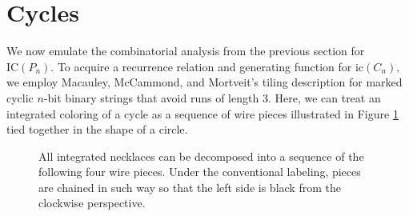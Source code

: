 \documentclass[11pt, reqno]{amsart}
\theoremstyle{definition}
\begin{document}
\section{Cycles}

We now emulate the combinatorial analysis from the previous section for $\text{IC}(P_n).$ To acquire a recurrence relation and generating function for $\text{ic}(C_n),$ we employ Macauley, McCammond, and Mortveit's \cite{MMM} tiling description for marked cyclic $n$-bit binary strings that avoid runs of length 3. Here, we can treat an integrated coloring of a cycle as a sequence of wire pieces illustrated in Figure \ref{cycletiles} tied together in the shape of a circle.

\begin{figure}[h]
\caption{All integrated necklaces can be decomposed into a sequence of the following four wire pieces. Under the conventional labeling, pieces are chained in such way so that the left side is black from the clockwise perspective.}\label{cycletiles}

\bigskip

\begin{minipage}{0.45\textwidth}
\centering
{}
\end{minipage}
\begin{minipage}{0.45\textwidth}
\centering
{}
\end{minipage}

\bigskip


\end{figure}
\end{document}
